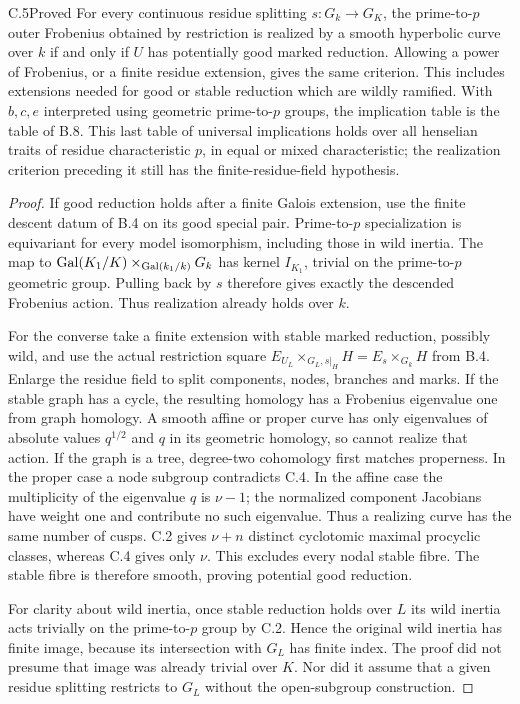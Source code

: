 \begin{claim}{C.5}{Proved}
For every continuous residue splitting $s:G_k\to G_K$, the prime-to-$p$
outer Frobenius obtained by restriction is realized by a smooth hyperbolic
curve over $k$ if and only if $U$ has potentially good marked reduction.
Allowing a power of Frobenius, or a finite residue extension, gives the same
criterion. This includes extensions needed for good or stable reduction
which are wildly ramified. With $b,c,e$ interpreted using geometric
prime-to-$p$ groups, the implication table is the table of B.8. This last
table of universal implications holds over all henselian traits of residue
characteristic $p$, in equal or mixed characteristic; the realization
criterion preceding it still has the finite-residue-field hypothesis.
\end{claim}
\begin{proof}
If good reduction holds after a finite Galois extension, use the finite
descent datum of B.4 on its good special pair. Prime-to-$p$ specialization
is equivariant for every model isomorphism, including those in wild inertia.
The map to
$\operatorname{Gal}(K_1/K)\times_{\operatorname{Gal}(k_1/k)}G_k$ has kernel $I_{K_1}$, trivial on
the prime-to-$p$ geometric group. Pulling back by $s$ therefore gives
exactly the descended Frobenius action. Thus realization already holds
over $k$.

For the converse take a finite extension with stable marked reduction,
possibly wild, and use the actual restriction square
$E_{U_L}\times_{G_L,s|_H}H=E_s\times_{G_k}H$ from B.4. Enlarge the
residue field to split components, nodes, branches and marks. If the stable
graph has a cycle, the resulting homology has a Frobenius eigenvalue one
from graph homology. A smooth affine or proper curve has only eigenvalues
of absolute values $q^{1/2}$ and $q$ in its geometric homology, so cannot
realize that action. If the graph is a tree, degree-two cohomology first
matches properness. In the proper case a node subgroup contradicts C.4.
In the affine case the multiplicity of the eigenvalue $q$ is $\nu-1$;
the normalized component Jacobians have weight one and contribute no such
eigenvalue. Thus a realizing curve has the same number of cusps. C.2 gives
$\nu+n$ distinct cyclotomic maximal procyclic classes, whereas C.4 gives
only $\nu$. This excludes every nodal stable fibre. The stable fibre is
therefore smooth, proving potential good reduction.

For clarity about wild inertia, once stable reduction holds over $L$ its
wild inertia acts trivially on the prime-to-$p$ group by C.2. Hence the
original wild inertia has finite image, because its intersection with
$G_L$ has finite index. The proof did not presume that image was already
trivial over $K$. Nor did it assume that a given residue splitting restricts
to $G_L$ without the open-subgroup construction.


\end{proof}
